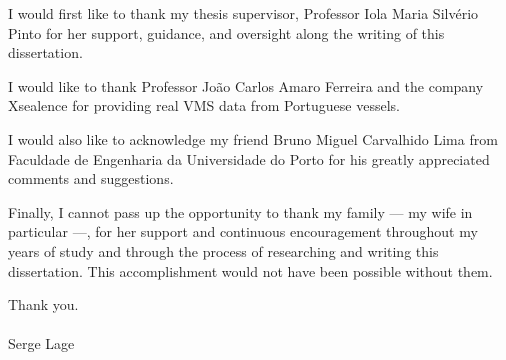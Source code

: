 \acknowledgements

I would first like to thank my thesis supervisor, Professor Iola Maria Silvério Pinto for her support, guidance, and oversight along the writing of this dissertation.

I would like to thank Professor João Carlos Amaro Ferreira and the company Xsealence for providing real VMS data from Portuguese vessels.

I would also like to acknowledge my friend Bruno Miguel Carvalhido Lima from Faculdade de Engenharia da Universidade do Porto for his greatly appreciated comments and suggestions.

Finally, I cannot pass up the opportunity to thank my family — my wife in
particular —, for her support and continuous encouragement throughout my years of study and through the process of researching and writing this dissertation. This accomplishment would not have been possible without them.

Thank you.
\\\\
Serge Lage

